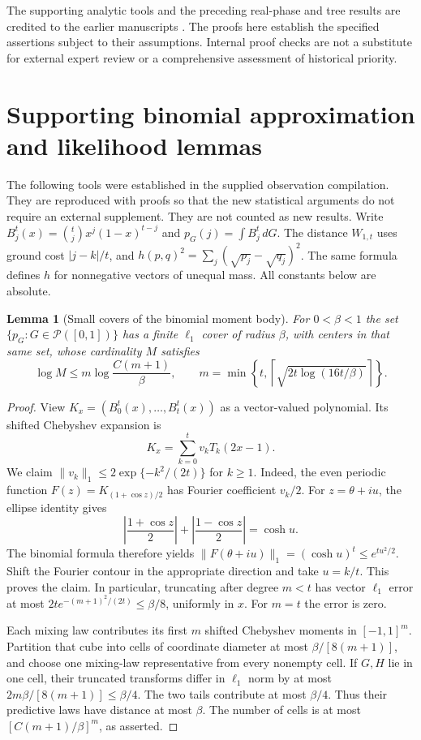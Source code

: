 \documentclass[11pt,a4paper]{article}
\newtheorem{lemma}[theorem]{Lemma}
\theoremstyle{definition}
\theoremstyle{remark}
\numberwithin{equation}{section}
\newcommand{\collectedappendix}{%
 \setcounter{section}{0}%
 \renewcommand{\thesection}{\Roman{part}.\Alph{section}}%
 \renewcommand{\theHsection}{p\arabic{part}.a\arabic{section}}%
}
\begin{document}
The supporting analytic tools and the preceding real-phase and tree
results are credited to the earlier manuscripts
\cite{p3:RT_Compiled2026,p3:KeioPrevious2026}. The proofs here establish the
specified assertions subject to their assumptions. Internal proof checks
are not a substitute for external expert review or a comprehensive
assessment of historical priority.


\collectedappendix
\section{Supporting binomial approximation and likelihood lemmas}
\label{p3:sec:binomial-tools}
The following tools were established in the supplied observation compilation.
They are reproduced with proofs so that the new statistical arguments do not
require an external supplement. They are not counted as new results.
Write $B_j^t(x)=\binom tjx^j(1-x)^{t-j}$ and
$p_G(j)=\int B_j^t\,dG$. The distance $W_{1,t}$ uses ground cost
$|j-k|/t$, and $h(p,q)^2=\sum_j(\sqrt{p_j}-\sqrt{q_j})^2$.
The same formula defines $h$ for nonnegative vectors of unequal mass.
All constants below are absolute.

\begin{lemma}[Small covers of the binomial moment body]
\label{p3:ET:bc:cover}
For $0<\beta<1$ the set $\{p_G:G\in\mathcal P([0,1])\}$ has a finite
$\ell_1$ cover of radius $\beta$, with centers in that same set, whose
cardinality $M$ satisfies
\begin{equation}\label{p3:ET:bc:entropy}
 \log M\le m\log\frac{C(m+1)}\beta,
 \qquad
 m=\min\left\{t,
       \left\lceil\sqrt{2t\log(16t/\beta)}\right\rceil\right\}.
\end{equation}
\end{lemma}
\begin{proof}
View $K_x=(B_0^t(x),\ldots,B_t^t(x))$ as a vector-valued polynomial.
Its shifted Chebyshev expansion is
\[
 K_x=\sum_{k=0}^t v_kT_k(2x-1).
\]
We claim $\|v_k\|_1\le2\exp\{-k^2/(2t)\}$ for $k\ge1$.
Indeed, the even periodic function
$F(z)=K_{(1+\cos z)/2}$ has Fourier coefficient $v_k/2$.
For $z=\theta+iu$, the ellipse identity gives
\[
 \left|\frac{1+\cos z}{2}\right|
 +\left|\frac{1-\cos z}{2}\right|=\cosh u.
\]
The binomial formula therefore yields
$\|F(\theta+iu)\|_1=(\cosh u)^t\le e^{tu^2/2}$.
Shift the Fourier contour in the appropriate direction and take
$u=k/t$. This proves the claim. In particular, truncating after degree
$m<t$ has vector $\ell_1$ error at most
$2t e^{-(m+1)^2/(2t)}\le\beta/8$, uniformly in $x$.
For $m=t$ the error is zero.

Each mixing law contributes its first $m$ shifted Chebyshev moments in
$[-1,1]^m$. Partition that cube into cells of coordinate diameter at most
$\beta/[8(m+1)]$, and choose one mixing-law representative from every
nonempty cell. If $G,H$ lie in one cell, their truncated transforms differ
in $\ell_1$ norm by at most
$2m\beta/[8(m+1)]\le\beta/4$. The two tails contribute at most
$\beta/4$. Thus their predictive laws have distance at most $\beta$.
The number of cells is at most $[C(m+1)/\beta]^m$, as asserted.
\end{proof}
\end{document}
